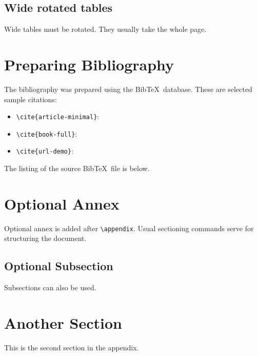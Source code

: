 \documentclass{cnbwp}
\begin{document}
\subsection{Wide rotated tables}
Wide tables must be rotated. They usually take the whole page.



\section{Preparing Bibliography}
The bibliography was prepared using the Bib\TeX\ database. These are selected sample citations:
\begin{itemize}
\item \verb:\cite{article-minimal}::
\cite{article-minimal}
\item \verb:\cite{book-full}::
\cite{book-full}
\item \verb:\cite{url-demo}::
\cite{url-demo}
\end{itemize}

\nocite{*}

The listing of the source Bib\TeX\ file is below.

{\small
}




\appendix
\section{Optional Annex}

Optional annex is added after \verb.\appendix.. Usual sectioning commands serve for structuring the
document.

\subsection{Optional Subsection}
Subsections can also be used.

\section{Another Section}
This is the second section in the appendix.
\end{document}
